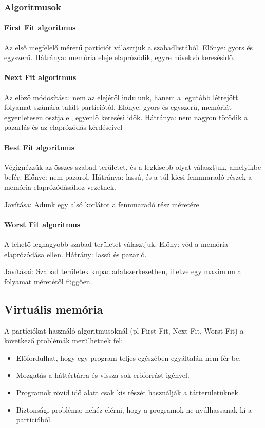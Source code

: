 \documentclass[fleqn,10pt,a4paper]{article}
\theoremstyle{magyar}
\begin{document}
  \subsubsection{Algoritmusok}
  
  \paragraph{First Fit algoritmus} Az első megfelelő méretű partíciót választjuk a szabadlistából. Előnye: gyors és
  egyszerű. Hátránya: memória eleje elaprózódik, egyre növekvő keresésidő.

  \paragraph{Next Fit algoritmus} Az előző módosítása: nem az elejéről indulunk, hanem a legutóbb létrejött folyamat
  számára talált partíciótól. Előnye: gyors és egyszerű, memóriát egyenletesen osztja el, egyenlő keresési
  idők. Hátránya: nem nagyon törődik a pazarlás és az elaprózódás kérdéseivel 
  
  \paragraph{Best Fit algoritmus} Végignézzük az összes szabad területet, és a legkisebb olyat választjuk, amelyikbe befér.
  Előnye: nem pazarol. Hátránya: lassú, és a túl kicsi fennmaradó részek a memória elaprózódásához vezetnek. 
  
  Javítása: Adunk egy alsó korlátot a fennmaradó rész méretére

  \paragraph{Worst Fit algoritmus} A lehető legnagyobb szabad területet választjuk. Előny: véd a memória elaprózódása
  ellen. Hátrány: lassú és pazarló.

  Javításai: Szabad területek kupac adatszerkezetben, illetve egy maximum a folyamat méretétől függően.


  \subsection{Virtuális memória}
  A partíciókat használó algoritmusoknál (pl First Fit, Next Fit, Worst Fit) a következő problémák merülhetnek fel:
  \begin{itemize}
  \item  Előfordulhat, hogy egy program teljes egészében egyáltalán nem fér be.
  \item Mozgatás a háttértárra és vissza sok erőforrást igényel.
  \item Programok rövid idő alatt csak kis részét használják a tárterületüknek.
  \item Biztonsági probléma: nehéz elérni, hogy a programok ne nyúlhassanak ki a partícióból.
  \end{itemize}
  
\end{document}

